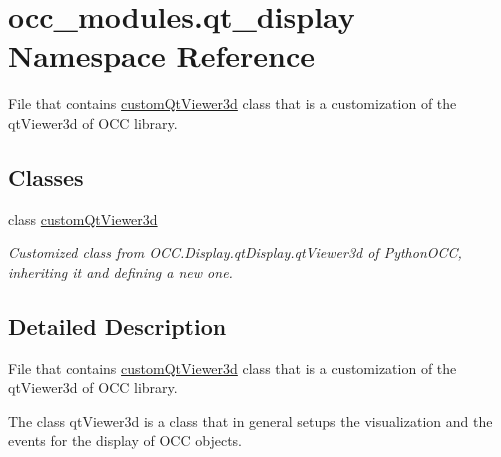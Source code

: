 \hypertarget{namespaceocc__modules_1_1qt__display}{}\section{occ\+\_\+modules.\+qt\+\_\+display Namespace Reference}
\label{namespaceocc__modules_1_1qt__display}


File that contains \hyperlink{classocc__modules_1_1qt__display_1_1custom_qt_viewer3d}{custom\+Qt\+Viewer3d} class that is a customization of the qt\+Viewer3d of O\+CC library.  


\subsection*{Classes}
\begin{DoxyCompactItemize}
\item 
class \hyperlink{classocc__modules_1_1qt__display_1_1custom_qt_viewer3d}{custom\+Qt\+Viewer3d}
\begin{DoxyCompactList}\small\item\em Customized class from O\+C\+C.\+Display.\+qt\+Display.\+qt\+Viewer3d of Python\+O\+CC, inheriting it and defining a new one. \end{DoxyCompactList}\end{DoxyCompactItemize}


\subsection{Detailed Description}
File that contains \hyperlink{classocc__modules_1_1qt__display_1_1custom_qt_viewer3d}{custom\+Qt\+Viewer3d} class that is a customization of the qt\+Viewer3d of O\+CC library. 

The class qt\+Viewer3d is a class that in general setups the visualization and the events for the display of O\+CC objects. 